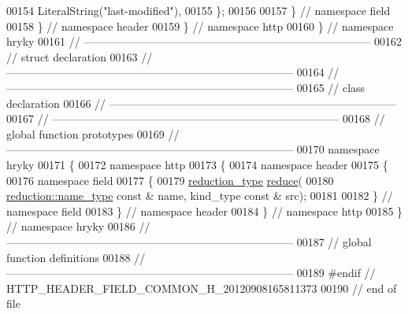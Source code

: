 \begin{DoxyCode}
00154         LiteralString(\textcolor{stringliteral}{"last-modified"}),
00155     \};
00156 
00157 \} \textcolor{comment}{// namespace field}
00158 \} \textcolor{comment}{// namespace header}
00159 \} \textcolor{comment}{// namespace http}
00160 \} \textcolor{comment}{// namespace hryky}
00161 \textcolor{comment}{//
      ------------------------------------------------------------------------------}
00162 \textcolor{comment}{// struct declaration}
00163 \textcolor{comment}{//
      ------------------------------------------------------------------------------}
00164 \textcolor{comment}{//
      ------------------------------------------------------------------------------}
00165 \textcolor{comment}{// class declaration}
00166 \textcolor{comment}{//
      ------------------------------------------------------------------------------}
00167 \textcolor{comment}{//
      ------------------------------------------------------------------------------}
00168 \textcolor{comment}{// global function prototypes}
00169 \textcolor{comment}{//
      ------------------------------------------------------------------------------}
00170 \textcolor{keyword}{namespace }hryky
00171 \{
00172 \textcolor{keyword}{namespace }http
00173 \{
00174 \textcolor{keyword}{namespace }header
00175 \{
00176 \textcolor{keyword}{namespace }field
00177 \{
00179     \hyperlink{namespacehryky_a343a9a4c36a586be5c2693156200eadc}{reduction_type} \hyperlink{namespacehryky_1_1http_a08fc36a78a8e2908140fcd102829a566}{reduce}(
00180         \hyperlink{namespacehryky_1_1reduction_ac686c30a4c8d196bbd0f05629a6b921f}{reduction::name_type} \textcolor{keyword}{const} & name, kind\_type \textcolor{keyword}{const} & src);
00181 
00182 \} \textcolor{comment}{// namespace field}
00183 \} \textcolor{comment}{// namespace header}
00184 \} \textcolor{comment}{// namespace http}
00185 \} \textcolor{comment}{// namespace hryky}
00186 \textcolor{comment}{//
      ------------------------------------------------------------------------------}
00187 \textcolor{comment}{// global function definitions}
00188 \textcolor{comment}{//
      ------------------------------------------------------------------------------}
00189 \textcolor{preprocessor}{#endif // HTTP\_HEADER\_FIELD\_COMMON\_H\_20120908165811373}
00190 \textcolor{preprocessor}{}\textcolor{comment}{// end of file}
\end{DoxyCode}
